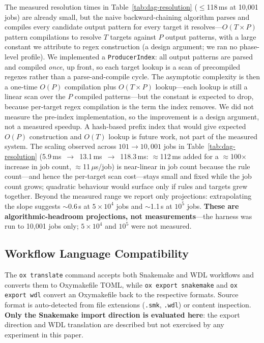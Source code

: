 \documentclass[12pt,a4paper]{article}
\newcommand{\code}[1]{{\texttt{\small\color{inlinecode}#1}}}
\begin{document}
The measured resolution times in Table~\ref{tab:dag-resolution}
($\leq$118\,ms at 10{,}001 jobs) are already small, but the naive
backward-chaining algorithm parses and compiles every candidate output
pattern for every target it resolves---$O(T \times P)$ pattern
compilations to resolve $T$ targets against $P$ output patterns, with a
large constant we attribute to regex construction (a design argument; we
ran no phase-level profile).
We implemented a \code{ProducerIndex}: all output patterns are parsed
and compiled \emph{once}, up front, so each target lookup is a scan of
precompiled regexes rather than a parse-and-compile cycle.  The
asymptotic complexity is then a one-time $O(P)$ compilation plus
$O(T \times P)$ lookup---each lookup is still a
linear scan over the $P$ compiled patterns---but the constant is
expected to drop, because per-target regex compilation is the term the
index removes.  We did not measure the pre-index implementation, so the
improvement is a design argument, not a measured speedup.  A hash-based prefix index that would give expected $O(P)$
construction and $O(T)$ lookup is future work, not part of the measured
system.  The scaling observed across
$101 \to 10{,}001$ jobs in Table~\ref{tab:dag-resolution} (5.9\,ms~$\to$~13.1\,ms~$\to$~118.3\,ms:
$\approx$112\,ms added for a $\approx$100$\times$ increase in job count, $\approx$11\,$\mu$s/job)
is near-linear in job count because the rule count---and hence the
per-target scan cost---stays small and fixed while the job count grows;
quadratic behaviour would surface only if rules and targets grew
together.  Beyond the measured range we report only projections: extrapolating
the slope suggests $\sim$0.6\,s at $5\times10^4$ jobs and $\sim$1.1\,s at $10^5$
jobs. \textbf{These are algorithmic-headroom projections, not measurements}---the
harness was run to 10{,}001 jobs only; $5\times10^4$ and $10^5$
were not measured.

\subsection{Workflow Language Compatibility}
\label{sec:snakemake-compat}

The \code{ox translate} command accepts both Snakemake and WDL workflows
and converts them to Oxymakefile TOML, while \code{ox export snakemake}
and \code{ox export wdl}
convert an Oxymakefile back to the respective formats. Source format is
auto-detected from file extensions (\code{.smk}, \code{.wdl}) or content
inspection. \textbf{Only the Snakemake import direction is evaluated
here}: the export direction and WDL translation are described but not
exercised by any experiment in this paper.
\end{document}
